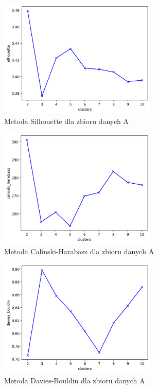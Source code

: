 \documentclass[a4paper,11pt]{article}
\begin{document}
\begin{figure}[H]
    	\centering
    	\includegraphics[width=0.67\textwidth]{images3/silhouette_Customer.png}
    	\caption{Metoda Silhouette dla zbioru danych A}
    	\label{silh_bs}
\end{figure}

\begin{figure}[H]
    	\centering
    	\includegraphics[width=0.67\textwidth]{images3/calinski_harabasz_Customer.png}
    	\caption{Metoda Calinski-Harabasz dla zbioru danych A}
    	\label{silh_bh}
\end{figure}

\begin{figure}[H]
    	\centering
    	\includegraphics[width=0.67\textwidth]{images3/davies_bouldin_Customer.png}
    	\caption{Metoda Davies-Bouldin dla zbioru danych A}
    	\label{silh_bd}
\end{figure}
\end{document}

